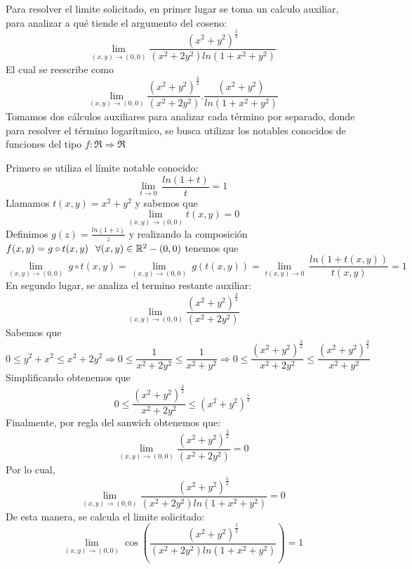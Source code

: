 \begin{solution}
Para resolver el limite solicitado, en primer lugar se toma un calculo auxiliar, para analizar a qué tiende el argumento del coseno:
\[
        \lim_{(x,y)\to(0,0)} \frac{(x^2 + y^2)^{\frac{5}{2}}}{(x^2+2y^2)ln(1+x^2+y^2)} 
    \]
El cual se reescribe como
\[
        \lim_{(x,y)\to(0,0)} \frac{(x^2 + y^2)^{\frac{3}{2}}}{(x^2+2y^2)} .\frac{(x^2 + y^2)}{ln(1+x^2+y^2)} 
    \]
    Tomamos dos cálculos auxiliares para analizar cada término por separado, donde para resolver el término logarítmico, se busca utilizar los notables conocidos de funciones del tipo $f:\Re\Rightarrow\Re$

Primero se utiliza el límite notable conocido:    
\[
        \lim_{t\to 0} \
        \frac{ln(1+t)}{t}=1
    \]
    Llamamos  $t(x,y)=x^{2}+y^{2}$ y sabemos que 
    \[
        \lim_{(x,y)\to(0,0)} t(x,y)=0
    \]
    Definimos $g(z)=\frac{ln(1+z)}{z} $ y realizando la composición $f(x,y)=g\circ t(x,y) \hspace{0.25cm}\forall (x,y)\in \mathbb{R}^ 2 -(0,0)$ tenemos que
\[
        \lim_{(x,y)\to (0,0)} \
        g\circ t(x,y)=\lim_{(x,y)\to (0,0)} \
        g(t(x,y))=\lim_{t(x,y)\to 0} \
        \frac{ln(1+t(x,y))}{t(x,y)}=1
    \]
En segundo lugar, se analiza el termino restante 
auxiliar:
\[
        \lim_{(x,y)\to(0,0)} \frac{(x^2 + y^2)^{\frac{3}{2}}}{(x^2+2y^2)} 
    \]
Sabemos que
\[
        0\le y^2+x^2\le x^2+2y^2    \Rightarrow   0\le \frac{1}{x^2+2y^2}\le \frac{1}{x^2+y^2} \Rightarrow   0\le \frac{(x^2 + y^2)^{\frac{3}{2}}}{x^2+2y^2}\le \frac{(x^2 + y^2)^{\frac{3}{2}}}{x^2+y^2}
    \]
Simplificando obtenemos que
\[
        0\le \frac{(x^2 + y^2)^{\frac{3}{2}}}{x^2+2y^2}\le (x^2 + y^2)^{\frac{1}{2}}
    \]
Finalmente, por regla del sanwich obtenemos que:
\[
        \lim_{(x,y)\to(0,0)} \frac{(x^2 + y^2)^{\frac{3}{2}}}{(x^2+2y^2)}=0 
    \]
Por lo cual, 
\[
        \lim_{(x,y)\to(0,0)} \frac{(x^2 + y^2)^{\frac{5}{2}}}{(x^2+2y^2)ln(1+x^2+y^2)} =0
    \]
De esta manera, se calcula el limite solicitado:
    \[
        \lim_{(x,y)\to(0,0)} \cos\left({\frac{(x^2 + y^2)^{\frac{5}{2}}}{(x^2+2y^2)ln(1+x^2+y^2)}} \right)=1
    \]

\end{solution}
\newpage


